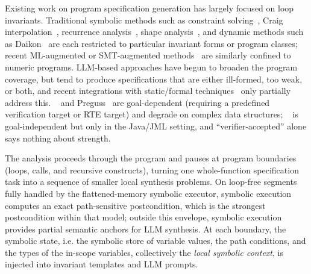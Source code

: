 


Existing work on program specification generation has largely focused on loop invariants. Traditional symbolic methods such as constraint solving~\cite{DBLP:conf/cav/ColonSS03,DBLP:journals/pacmpl/LiuFYSL22}, Craig interpolation~\cite{FiB_Squeezing_loop,DBLP:conf/cade/GanDXZKC16,Nonlinear_Craig_Interpolant_Generation}, recurrence analysis~\cite{beyer2024decomposing,wonisch2012predicate}, shape analysis~\cite{calcagno2009compositional}, and dynamic methods such as Daikon~\cite{Daikon} are each restricted to particular invariant forms or program classes; recent ML-augmented or SMT-augmented methods~\cite{Code2Inv_a_Deep_Learning_Framework_for_Program_Verification,Loop_Invariant_Inference_through_SMT_Solving_Enhanced_Reinforcement_Learning,DBLP:journals/pacmse/CaoWXYWCM25} are similarly confined to numeric programs. LLM-based approaches have begun to broaden the program coverage, but tend to produce specifications that are either ill-formed, too weak, or both, and recent integrations with static/formal techniques~\cite{autospec,Enhancing_Automated_Loop_Invariant_Generation_for_Complex_Programs_with_Large_Language_Models,SpecGen,Wang2025ATO} only partially address this. \autospec~\cite{autospec} and Preguss~\cite{Wang2025ATO} are goal-dependent (requiring a predefined verification target or RTE target) and degrade on complex data structures; \specgen~\cite{SpecGen} is goal-independent but only in the Java/JML setting, and ``verifier-accepted'' alone says nothing about strength. 


 The analysis proceeds through the program and pauses at program boundaries (loops, calls, and recursive constructs), turning one whole-function specification task into a sequence of smaller local synthesis problems. On loop-free segments fully handled by the flattened-memory symbolic executor, symbolic execution computes an exact path-sensitive postcondition, which is the strongest postcondition within that model; outside this envelope, symbolic execution provides partial semantic anchors for LLM synthesis. At each boundary, the symbolic state, i.e. the symbolic store of variable values, the path conditions, and the types of the in-scope variables, collectively the \emph{local symbolic context}, is injected into invariant templates and LLM prompts. 

